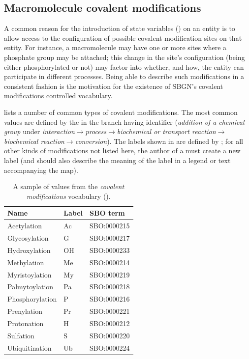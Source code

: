 \subsection{Macromolecule covalent modifications}
\label{sec:covalent-mod-cv}

A common reason for the introduction of state variables () on an entity is to allow access to the configuration of possible covalent modification sites on that entity.  For instance, a macromolecule may have one or more sites where a phosphate group may be attached; this change in the site's configuration (\ie being either phosphorylated or not) may factor into whether, and how, the entity can participate in different processes.  Being able to describe such modifications in a consistent fashion is the motivation for the existence of SBGN's covalent modifications controlled vocabulary.  

 lists a number of common types of covalent modifications.  The most common values are defined by the \sbo in the branch having identifier  (\emph{addition of a chemical group} under \emph{interaction}$\rightarrow$\emph{process}$\rightarrow$\emph{biochemical or transport reaction}$\rightarrow$\\\emph{biochemical reaction}$\rightarrow$\emph{conversion}).  The labels shown in  are defined by \SBGNPDLone; for all other kinds of modifications not listed here, the author of a \PD must create a new label (and should also describe the meaning of the label in a legend or text accompanying the map).

\begin{table}[h]
  \centering
  \begin{tabular}{l>{\ttfamily}l>{\ttfamily}l}
    \toprule
    \textbf{Name}   & \textbf{\rmfamily Label} & \textbf{\rmfamily SBO term} \\
    \midrule
    Acetylation     & Ac    & SBO:0000215\\
    Glycosylation   & G     & SBO:0000217\\
    Hydroxylation   & OH    & SBO:0000233\\
    Methylation     & Me    & SBO:0000214\\
    Myristoylation  & My    & SBO:0000219\\
    Palmytoylation  & Pa    & SBO:0000218\\
    Phosphorylation & P     & SBO:0000216\\
    Prenylation     & Pr    & SBO:0000221\\
    Protonation     & H     & SBO:0000212\\
    Sulfation       & S     & SBO:0000220\\
    Ubiquitination  & Ub    & SBO:0000224\\
    \bottomrule
  \end{tabular}
  \caption{A sample of values from the \emph{covalent modifications} vocabulary
    ().}
  \label{tab:covalent-mod-cv}
\end{table}



